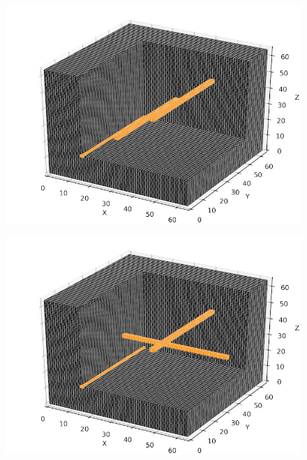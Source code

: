 \documentclass[fleqn,a4paper,oneside,openany]{book}
\begin{document}
\begin{figure}
      \begin{minipage}[b]{145pt}
     \centering
     \includegraphics[trim = 0 0 0 0, clip, width=\linewidth] {phantom_figures/pattern_2.png}
     \label{fig:phantom_pattern_2}
     \hspace{100pt}
   \end{minipage}
   \begin{minipage}[b]{145pt}
     \centering
     \includegraphics[trim = 0 0 0 0, clip, width=\linewidth] {phantom_figures/pattern_3.png}
     \label{fig:phantom_pattern_3}
     \hspace{100pt}
   \end{minipage}
   \begin{minipage}[b]{145pt}

\end{minipage}
\end{figure}
\end{document}
